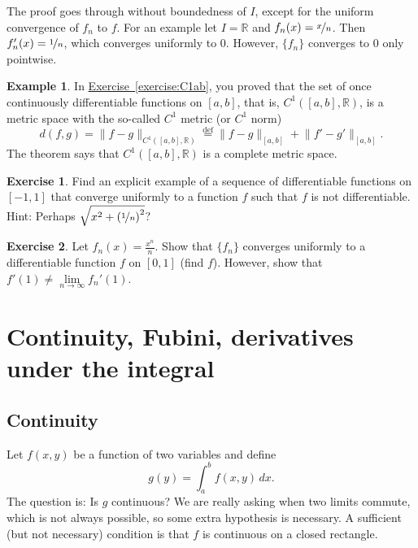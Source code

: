 \documentclass[12pt,openany]{book}
\newcommand{\snorm}[1]{\lVert {#1} \rVert}
\newcommand{\R}{{\mathbb{R}}}
\theoremstyle{plain}
\theoremstyle{remark}
\theoremstyle{definition}
\newenvironment{exbox}{%
    \def\FrameCommand{\vrule width 1pt \relax\hspace{10pt}}%
    \MakeFramed{\advance\hsize-\width\FrameRestore}%
}{%
    \endMakeFramed
}
\theoremstyle{exercise}
\newtheorem{exercise}{Exercise}[section]
\theoremstyle{example}
\newtheorem{example}[thm]{Example}
\newcommand{\exerciseref}[1]{\hyperref[#1]{Exercise~\ref*{#1}}}
\begin{document}
The proof goes through without boundedness of $I$, except for the
uniform convergence of $f_n$ to $f$.  For an example let $I = \R$ and
$f_n(x) = \nicefrac{x}{n}$.  Then $f_n'(x)=\nicefrac{1}{n}$, which
converges uniformly to $0$.  However, $\{f_n\}$ converges to $0$ only pointwise.

\begin{example}
In \exerciseref{exercise:C1ab}, you proved that
the set of once continuously differentiable functions on $[a,b]$, that is,
$C^1([a,b],\R)$, is a metric space with the so-called
$C^1$ metric (or $C^1$ norm)
\begin{equation*}
d(f,g) =
\snorm{f-g}_{C^1([a,b],\R)}
\overset{\text{def}}{=}
\snorm{f-g}_{[a,b]} + \snorm{f'-g'}_{[a,b]}.
\end{equation*}
The theorem says that $C^1([a,b],\R)$ is a complete metric space.
\end{example}

\begin{exbox}
\begin{exercise}
Find an explicit example of a sequence of
differentiable functions on $[-1,1]$ that converge uniformly to
a function $f$ such that $f$ is not differentiable.
Hint:
Perhaps $\sqrt{x^2+{(\nicefrac{1}{n})}^2}$?
\end{exercise}

\begin{exercise}
Let $f_n(x) = \frac{x^n}{n}$.  Show that $\{ f_n \}$ converges uniformly to
a differentiable function $f$ on $[0,1]$ (find $f$).  However, show that
$f'(1) \neq \lim\limits_{n\to\infty} f_n'(1)$.
\end{exercise}
\end{exbox}


\section{Continuity, Fubini, derivatives under the integral}
\label{sec:contlimitsunderint}

\subsection{Continuity}

Let $f(x,y)$ be a function of two variables and define
\begin{equation*}
g(y) = \int_a^b f(x,y) \,dx .
\end{equation*}
The question is: Is $g$ continuous?
We are really asking when two limits commute,
which is not always possible, so some extra hypothesis
is necessary.  A sufficient (but not
necessary) condition is that $f$ is continuous on a closed rectangle.
\end{document}
